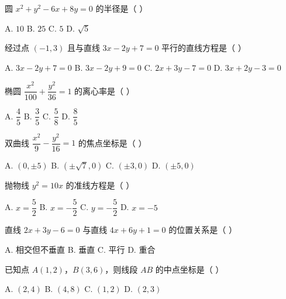 \documentclass[11pt, a4paper]{article}
\begin{document}
\begin{baitap}[13]
圆 $x^2 + y^2 - 6x + 8y = 0$ 的半径是（ ）
\par\vspace{3pt}
\noindent A. $10$ \quad B. $25$ \quad C. $5$ \quad D. $\sqrt{5}$
\end{baitap}

\begin{baitap}[14]
经过点 $(-1, 3)$ 且与直线 $3x - 2y + 7 = 0$ 平行的直线方程是（ ）
\par\vspace{3pt}
\noindent A. $3x - 2y + 7 = 0$ \quad B. $3x - 2y + 9 = 0$ \quad C. $2x + 3y - 7 = 0$ \quad D. $3x + 2y - 3 = 0$
\end{baitap}

\begin{baitap}[15]
椭圆 $\dfrac{x^2}{100} + \dfrac{y^2}{36} = 1$ 的离心率是（ ）
\par\vspace{3pt}
\noindent A. $\dfrac{4}{5}$ \quad B. $\dfrac{3}{5}$ \quad C. $\dfrac{5}{8}$ \quad D. $\dfrac{8}{5}$
\end{baitap}

\begin{baitap}[16]
双曲线 $\dfrac{x^2}{9} - \dfrac{y^2}{16} = 1$ 的焦点坐标是（ ）
\par\vspace{3pt}
\noindent A. $(0, \pm 5)$ \quad B. $(\pm \sqrt{7}, 0)$ \quad C. $(\pm 3, 0)$ \quad D. $(\pm 5, 0)$
\end{baitap}

\begin{baitap}[17]
抛物线 $y^2 = 10x$ 的准线方程是（ ）
\par\vspace{3pt}
\noindent A. $x = \dfrac{5}{2}$ \quad B. $x = -\dfrac{5}{2}$ \quad C. $y = -\dfrac{5}{2}$ \quad D. $x = -5$
\end{baitap}

\begin{baitap}[18]
直线 $2x + 3y - 6 = 0$ 与直线 $4x + 6y + 1 = 0$ 的位置关系是（ ）
\par\vspace{3pt}
\noindent A. 相交但不垂直 \quad B. 垂直 \quad C. 平行 \quad D. 重合
\end{baitap}

\begin{baitap}[19]
已知点 $A(1, 2)$，$B(3, 6)$，则线段 $AB$ 的中点坐标是（ ）
\par\vspace{3pt}
\noindent A. $(2, 4)$ \quad B. $(4, 8)$ \quad C. $(1, 2)$ \quad D. $(2, 3)$
\end{baitap}
\end{document}
